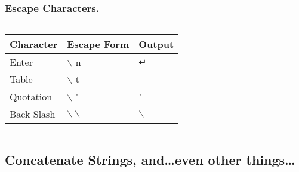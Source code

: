 \documentclass[
  11pt, %
  xcolor=dvipsnames
]{beamer}
\begin{document}
\begin{frame}[fragile]
	\frametitle{Escape Characters.}

	\begin{columns}
		\begin{column}{0.8\textwidth}

			\begin{table}
				\begin{tabular}{l l l}
					\toprule
					Character  & Escape Form            & Output                             \\
					\midrule
					Enter      & $\backslash$ n         & ↵                                  \\
					Table      & $\backslash$ t         & \fcolorbox{red}{yellow}{\indent  } \\
					Quotation  & $\backslash$ "         & "                                  \\
					Back Slash & $\backslash\backslash$ & $\backslash$                       \\
					\bottomrule
				\end{tabular}
			\end{table}

		\end{column}
	\end{columns}

\end{frame}

\subsection{Concatenate Strings, and\dots even other things\dots}
\end{document}
